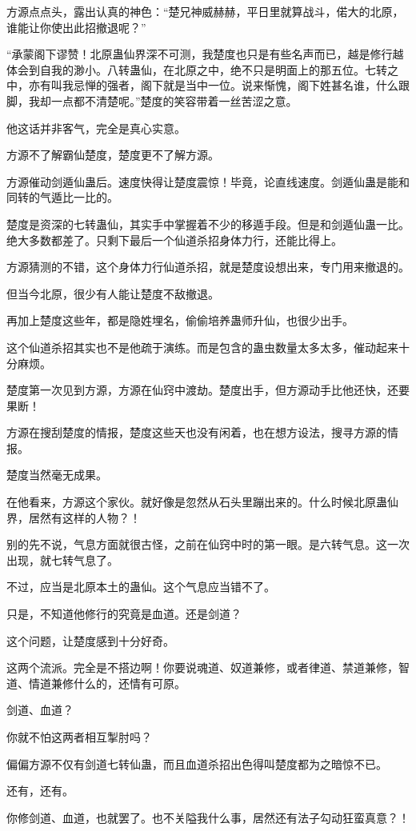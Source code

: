 \begin{this_body}
方源点点头，露出认真的神色：“楚兄神威赫赫，平日里就算战斗，偌大的北原，谁能让你使出此招撤退呢？”

“承蒙阁下谬赞！北原蛊仙界深不可测，我楚度也只是有些名声而已，越是修行越体会到自我的渺小。八转蛊仙，在北原之中，绝不只是明面上的那五位。七转之中，亦有叫我忌惮的强者，阁下就是当中一位。说来惭愧，阁下姓甚名谁，什么跟脚，我却一点都不清楚呢。”楚度的笑容带着一丝苦涩之意。

他这话并非客气，完全是真心实意。

方源不了解霸仙楚度，楚度更不了解方源。

方源催动剑遁仙蛊后。速度快得让楚度震惊！毕竟，论直线速度。剑遁仙蛊是能和同转的气遁比一比的。

楚度是资深的七转蛊仙，其实手中掌握着不少的移遁手段。但是和剑遁仙蛊一比。绝大多数都差了。只剩下最后一个仙道杀招身体力行，还能比得上。

方源猜测的不错，这个身体力行仙道杀招，就是楚度设想出来，专门用来撤退的。

但当今北原，很少有人能让楚度不敌撤退。

再加上楚度这些年，都是隐姓埋名，偷偷培养蛊师升仙，也很少出手。

这个仙道杀招其实也不是他疏于演练。而是包含的蛊虫数量太多太多，催动起来十分麻烦。

楚度第一次见到方源，方源在仙窍中渡劫。楚度出手，但方源动手比他还快，还要果断！

方源在搜刮楚度的情报，楚度这些天也没有闲着，也在想方设法，搜寻方源的情报。

楚度当然毫无成果。

在他看来，方源这个家伙。就好像是忽然从石头里蹦出来的。什么时候北原蛊仙界，居然有这样的人物？！

别的先不说，气息方面就很古怪，之前在仙窍中时的第一眼。是六转气息。这一次出现，就七转气息了。

不过，应当是北原本土的蛊仙。这个气息应当错不了。

只是，不知道他修行的究竟是血道。还是剑道？

这个问题，让楚度感到十分好奇。

这两个流派。完全是不搭边啊！你要说魂道、奴道兼修，或者律道、禁道兼修，智道、情道兼修什么的，还情有可原。

剑道、血道？

你就不怕这两者相互掣肘吗？

偏偏方源不仅有剑道七转仙蛊，而且血道杀招出色得叫楚度都为之暗惊不已。

还有，还有。

你修剑道、血道，也就罢了。也不关隘我什么事，居然还有法子勾动狂蛮真意？！


\end{this_body}
